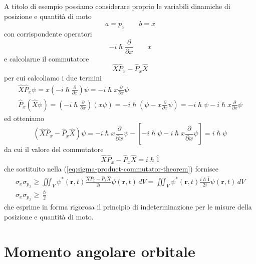 A titolo di esempio possiamo considerare proprio le variabili dinamiche
di posizione e quantità di moto
\[
    a = p_x \qquad b = x
\]
con corrispondente operatori \[
                                 - i \hslash \frac{\partial}{\partial x} \qquad x
\] e calcolarne il commutatore
\[
    \hat{X}\hat{P}_{x} - \hat{P}_{x}\hat{X}
\] per cui calcoliamo i due termini \begin{gather*}
                                        \hat{X}\hat{P}_{x} \psi = x \left(  - i \hslash \frac{\partial}{\partial x} \right) \psi = - i \hslash x \frac{\partial}{\partial x}\psi\\
                                        \hat{P}_{x}(\hat{X} \psi) = \left( - i \hslash \frac{\partial}{\partial x} \right)(x \psi)  =
                                        - i \hslash \left( \psi - x \frac{\partial}{\partial x} \psi \right) = - i \hslash \psi - i \hslash x \frac{\partial}{\partial x} \psi
\end{gather*}
ed otteniamo
\[
    (\hat{X}\hat{P}_{x} - \hat{P}_{x}\hat{X}) \psi = - i \hslash x \frac{\partial}{\partial x}\psi - \left[ - i \hslash \psi - i \hslash x \frac{\partial}{\partial x} \psi \right] = i \hslash \psi
\]
da cui il valore del commutatore
\[
    \hat{X}\hat{P}_{x} - \hat{P}_{x}\hat{X} = i \hslash  \hat{1}
\]
che sostituito nella (\ref{eq:sigma-product-commutator-theorem}) fornisce
\begin{gather*}
    \sigma_{x} \sigma_{p_{x}} \geq \iiint_{V} \psi^{*}(\bm{r},t) \frac{\hat{X}\hat{P}_{x} - \hat{P}_{x}\hat{X}}{2 i } \psi(\bm{r},t) \, dV =
    \iiint_{V} \psi^{*}(\bm{r},t) \frac{i \hslash  \hat{1}}{2i}\psi(\bm{r},t) \, dV\\
    \sigma_{x}\sigma_{p_{x}} \geq \frac{\hslash}{2}
\end{gather*}
che esprime in forma rigorosa il principio di indeterminazione per le
misure della posizione e quantità di moto.

\section{Momento angolare orbitale}\label{sec:momento-angolare-orbitale}

